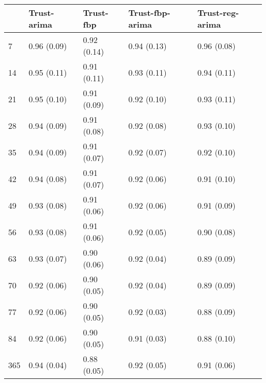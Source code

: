 \begin{tabular}{lllll}
\toprule
{} &  Trust-arima &    Trust-fbp & Trust-fbp-arima & Trust-reg-arima \\
\midrule
7   &  0.96 (0.09) &  0.92 (0.14) &     0.94 (0.13) &     0.96 (0.08) \\
14  &  0.95 (0.11) &  0.91 (0.11) &     0.93 (0.11) &     0.94 (0.11) \\
21  &  0.95 (0.10) &  0.91 (0.09) &     0.92 (0.10) &     0.93 (0.11) \\
28  &  0.94 (0.09) &  0.91 (0.08) &     0.92 (0.08) &     0.93 (0.10) \\
35  &  0.94 (0.09) &  0.91 (0.07) &     0.92 (0.07) &     0.92 (0.10) \\
42  &  0.94 (0.08) &  0.91 (0.07) &     0.92 (0.06) &     0.91 (0.10) \\
49  &  0.93 (0.08) &  0.91 (0.06) &     0.92 (0.06) &     0.91 (0.09) \\
56  &  0.93 (0.08) &  0.91 (0.06) &     0.92 (0.05) &     0.90 (0.08) \\
63  &  0.93 (0.07) &  0.90 (0.06) &     0.92 (0.04) &     0.89 (0.09) \\
70  &  0.92 (0.06) &  0.90 (0.05) &     0.92 (0.04) &     0.89 (0.09) \\
77  &  0.92 (0.06) &  0.90 (0.05) &     0.92 (0.03) &     0.88 (0.09) \\
84  &  0.92 (0.06) &  0.90 (0.05) &     0.91 (0.03) &     0.88 (0.10) \\
365 &  0.94 (0.04) &  0.88 (0.05) &     0.92 (0.05) &     0.91 (0.06) \\
\bottomrule
\end{tabular}
